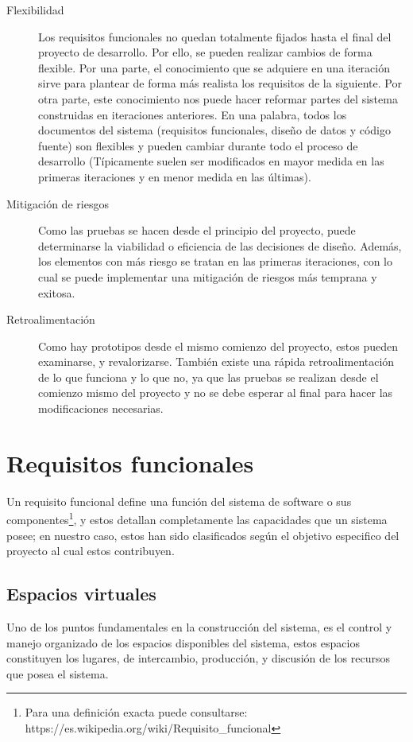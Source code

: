 \begin{description}
\item [Flexibilidad] Los requisitos funcionales no quedan totalmente fijados
hasta el final del proyecto de desarrollo. Por ello, se pueden realizar cambios
de forma flexible. Por una parte, el conocimiento que se adquiere en una
iteración sirve para plantear de forma más realista los requisitos de la
siguiente. Por otra parte, este conocimiento nos puede hacer reformar partes del
sistema construidas en iteraciones anteriores. En una palabra, todos los
documentos del sistema (requisitos funcionales, diseño de datos y código fuente)
son flexibles y pueden cambiar durante todo el proceso de desarrollo
(Típicamente suelen ser modificados en mayor medida en las primeras iteraciones
y en menor medida en las últimas).
\item [Mitigación de riesgos] Como las pruebas se hacen desde el principio del
proyecto, puede determinarse la viabilidad o eficiencia de las decisiones de
diseño. Además, los elementos con más riesgo se tratan en las primeras
iteraciones, con lo cual se puede implementar una mitigación de riesgos más 
temprana y exitosa.
\item [Retroalimentación] Como hay prototipos desde el mismo comienzo del
proyecto, estos pueden examinarse, y revalorizarse. También existe una rápida
retroalimentación de lo que funciona y lo que no, ya que las pruebas se 
realizan desde el comienzo mismo del proyecto y no se debe esperar al final
para hacer las modificaciones necesarias.
\end{description}

\section{Requisitos funcionales}

Un requisito funcional define una función del sistema de software o sus
componentes\footnote{Para una definición exacta puede consultarse:
https://es.wikipedia.org/wiki/Requisito\_funcional}, y estos detallan
completamente las capacidades que un sistema posee; en nuestro caso, estos han
sido clasificados según el objetivo especifico del proyecto al cual estos
contribuyen.

\subsection{Espacios virtuales}

Uno de los puntos fundamentales en la construcción del sistema, es el control y
manejo organizado de los espacios disponibles del sistema, estos espacios
constituyen los lugares, de intercambio, producción, y discusión de los recursos
que posea el sistema.


